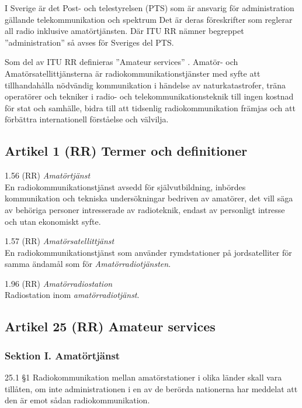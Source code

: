 I Sverige är det Post- och telestyrelsen (PTS) som är ansvarig för
administration gällande telekommunikation och spektrum Det är deras
föreskrifter som reglerar all radio inklusive amatörtjänsten.
Där ITU RR nämner begreppet ''administration'' så avses för Sveriges del PTS.

Som del av ITU RR definieras ''Amateur services'' \cite[Article 25]{ITU-RR}.
Amatör- och Amatörsatellittjänsterna är radiokommunikationstjänster
med syfte att tillhandahålla nödvändig kommunikation i händelse av
naturkatastrofer, träna operatörer och tekniker i radio- och
telekommunikationsteknik till ingen kostnad för stat och samhälle,
bidra till att tidsenlig radiokommunikation främjas och att förbättra
internationell förståelse och välvilja.

\subsection{Artikel 1 (RR) Termer och definitioner}

1.56 (RR) \emph{Amatörtjänst} \cite[1.56]{ITU-RR}\\
En radiokommunikationstjänst avsedd för självutbildning, inbördes
kommunikation och tekniska undersökningar bedriven av amatörer, det
vill säga av behöriga personer intresserade av radioteknik,
endast av personligt intresse och utan ekonomiskt syfte.

1.57 (RR) \emph{Amatörsatellittjänst} \cite[1.57]{ITU-RR}\\
En radiokommunikationstjänst som använder rymdstationer på
jordsatelliter för samma ändamål som för \emph{Amatörradiotjänsten}.

1.96 (RR) \emph{Amatörradiostation} \cite[1.96]{ITU-RR}\\
Radiostation inom \emph{amatörradiotjänst}.

\subsection{Artikel 25 (RR) Amateur services}

\subsubsection{Sektion I. Amatörtjänst}
25.1 \S1 Radiokommunikation mellan amatörstationer i olika länder
skall vara tillåten, om inte administrationen i en av de berörda
nationerna har meddelat att den är emot sådan radiokommunikation.
\cite[25.1]{ITU-RR}

